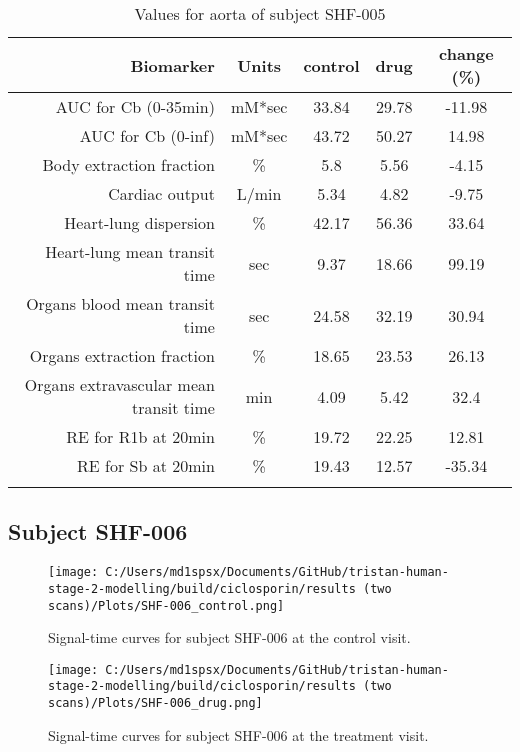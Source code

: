 \documentclass{epflreport}%
\begin{document}
\begin{longtable}{rcccc}%
\hline%
Biomarker&Units&control&drug&change (\%)\\%
\hline%
AUC for Cb (0{-}35min)&mM*sec&33.84&29.78&{-}11.98\\%
AUC for Cb (0{-}inf)&mM*sec&43.72&50.27&14.98\\%
Body extraction fraction&\%&5.8&5.56&{-}4.15\\%
Cardiac output&L/min&5.34&4.82&{-}9.75\\%
Heart{-}lung dispersion&\%&42.17&56.36&33.64\\%
Heart{-}lung mean transit time&sec&9.37&18.66&99.19\\%
Organs blood mean transit time&sec&24.58&32.19&30.94\\%
Organs extraction fraction&\%&18.65&23.53&26.13\\%
Organs extravascular mean transit time&min&4.09&5.42&32.4\\%
RE for R1b at 20min&\%&19.72&22.25&12.81\\%
RE for Sb at 20min&\%&19.43&12.57&{-}35.34\\%
\hline%
\caption{Values for aorta of subject SHF-005} \\%
\end{longtable}%
\clearpage%
\subsection{Subject SHF{-}006}%
\label{subsec:SubjectSHF{-}006}%

%


\begin{figure}[h!]%
\centering%
\texttt{[image: C:/Users/md1spsx/Documents/GitHub/tristan-human-stage-2-modelling/build/ciclosporin/results (two scans)/Plots/SHF-006\_control.png]}%
\caption{Signal{-}time curves for subject SHF{-}006 at the control visit.}%
\end{figure}

%


\begin{figure}[h!]%
\centering%
\texttt{[image: C:/Users/md1spsx/Documents/GitHub/tristan-human-stage-2-modelling/build/ciclosporin/results (two scans)/Plots/SHF-006\_drug.png]}%
\caption{Signal{-}time curves for subject SHF{-}006 at the treatment visit.}%
\end{figure}
\end{document}
